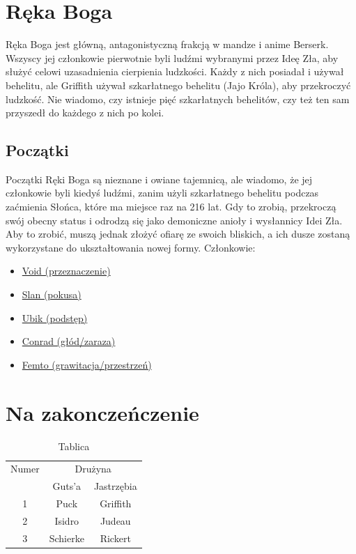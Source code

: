 \documentclass{article}
\begin{document}
\newpage
\section{\Huge{Ręka Boga}}
\noindent
Ręka Boga jest główną, antagonistyczną frakcją w mandze i anime Berserk. Wszyscy jej członkowie pierwotnie byli ludźmi wybranymi przez Ideę Zła, aby służyć celowi uzasadnienia cierpienia ludzkości. Każdy z nich posiadał i używał behelitu, ale Griffith używał szkarłatnego behelitu (Jajo Króla), aby przekroczyć ludzkość. Nie wiadomo, czy istnieje pięć szkarłatnych behelitów, czy też ten sam przyszedł do każdego z nich po kolei.
\newline\newline
\subsection{Początki}
Początki Ręki Boga są nieznane i owiane tajemnicą, ale wiadomo, że jej członkowie byli kiedyś ludźmi, zanim użyli szkarłatnego behelitu podczas zaćmienia Słońca, które ma miejsce raz na 216 lat. Gdy to zrobią, przekroczą swój obecny status i odrodzą się jako demoniczne anioły i wysłannicy Idei Zła. Aby to zrobić, muszą jednak złożyć ofiarę ze swoich bliskich, a ich dusze zostaną wykorzystane do ukształtowania nowej formy.
\newline\newline
Członkowie:
\begin{itemize}
\item
\href{https://berserk.fandom.com/wiki/Void}{Void (przeznaczenie)}
\item
\href{https://berserk.fandom.com/wiki/Slan}{Slan (pokusa)}
\item
\href{https://berserk.fandom.com/wiki/Ubik}{Ubik (podstęp)}
\item
\href{https://berserk.fandom.com/wiki/Conrad}{Conrad (głód/zaraza)}
\item
\href{https://berserk.fandom.com/wiki/Femto}{Femto (grawitacja/przestrzeń)}
\end{itemize}

\newpage
\section{Na zakoncze\'nczenie}
\begin{table}[h!]
\begin{center}
\begin{tabular}{|c|c|c|} \hline
Numer & \multicolumn{2}{|c|}{Drużyna} \\
\cline{2-3} & Guts'a & Jastrzębia \\ \hline
1 & Puck & Griffith \\\hline
2 & Isidro & Judeau \\\hline
3 & Schierke & Rickert \\ \hline
\end{tabular}
\end{center}
\caption{Tablica}
\end{table}
\end{document}
